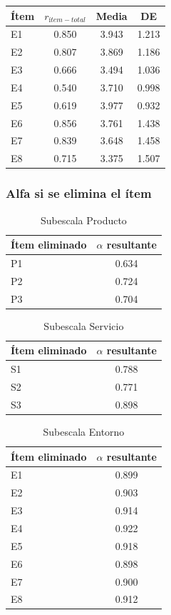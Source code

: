 \documentclass[
  spanish,
]{article}
\begin{document}
\begin{table}[!h]
\centering
\begin{tabular}{lccc}
\toprule
Ítem & $r_{ítem-total}$ & Media & DE\\
\midrule
E1 & 0.850 & 3.943 & 1.213\\
E2 & 0.807 & 3.869 & 1.186\\
E3 & 0.666 & 3.494 & 1.036\\
E4 & 0.540 & 3.710 & 0.998\\
E5 & 0.619 & 3.977 & 0.932\\
\addlinespace
E6 & 0.856 & 3.761 & 1.438\\
E7 & 0.839 & 3.648 & 1.458\\
E8 & 0.715 & 3.375 & 1.507\\
\bottomrule
\end{tabular}
\end{table}

\subsubsection{Alfa si se elimina el
ítem}\label{alfa-si-se-elimina-el-uxedtem}

\begin{table}[!h]
\centering
\caption{\label{tab:alpha-drop-prod}Subescala Producto}
\centering
\begin{tabular}[t]{lc}
\toprule
Ítem eliminado & $\alpha$ resultante\\
\midrule
P1 & 0.634\\
P2 & 0.724\\
P3 & 0.704\\
\bottomrule
\end{tabular}
\end{table}

\begin{table}[!h]
\centering
\caption{\label{tab:alpha-drop-serv}Subescala Servicio}
\centering
\begin{tabular}[t]{lc}
\toprule
Ítem eliminado & $\alpha$ resultante\\
\midrule
S1 & 0.788\\
S2 & 0.771\\
S3 & 0.898\\
\bottomrule
\end{tabular}
\end{table}

\begin{table}[!h]
\centering
\caption{\label{tab:alpha-drop-ent}Subescala Entorno}
\centering
\begin{tabular}[t]{lc}
\toprule
Ítem eliminado & $\alpha$ resultante\\
\midrule
E1 & 0.899\\
E2 & 0.903\\
E3 & 0.914\\
E4 & 0.922\\
E5 & 0.918\\
\addlinespace
E6 & 0.898\\
E7 & 0.900\\
E8 & 0.912\\
\bottomrule
\end{tabular}
\end{table}
\end{document}
